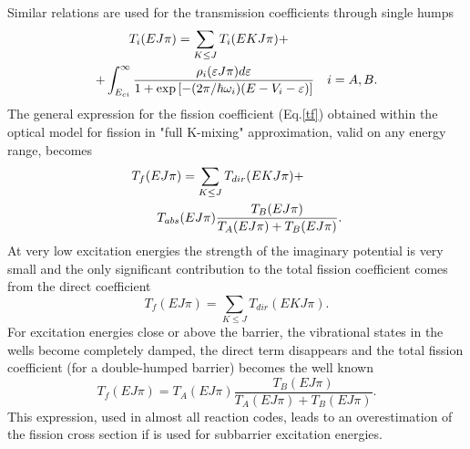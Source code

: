 Similar relations are used for the transmission coefficients through single
humps 
\begin{eqnarray}
T_{i}(EJ\pi)=\sum_{K\le J}T_{i}(EKJ\pi) +\qquad\qquad\qquad\quad  \notag \\
+ \int_{E_{ci}}^{\infty} \frac {\rho_{i}(\varepsilon J\pi)d\varepsilon} {%
1+\exp\left[ -({2\pi}/\hbar\omega_{i}) (E-V_{i}-\varepsilon)\right] } \quad
i=A,B.  \label{tfi}
\end{eqnarray}
The general expression for the fission coefficient (Eq.\ref{tf}) obtained
within the optical model for fission in "full K-mixing" approximation, valid
on any energy range, becomes 
\begin{eqnarray}
T_{f}(EJ\pi)=\sum_{K\le J}T_{dir}(EKJ\pi)+\qquad\quad  \notag \\
T_{abs}(E J \pi)\frac{T_{B}(E J \pi)}{T_{A}(E J \pi)+T_{B}(E J \pi)}.
\label{tfis}
\end{eqnarray}
At very low excitation energies the strength of the imaginary potential is
very small and the only significant contribution to the total fission
coefficient comes from the direct coefficient 
\begin{equation}
T_{f}(EJ\pi)=\sum_{K\le J}T_{dir}(EKJ\pi).  \label{tf-zero}
\end{equation}
For excitation energies close or above the barrier, the vibrational states
in the wells become completely damped, the direct term disappears and the
total fission coefficient (for a double-humped barrier) becomes the well
known 
\begin{equation}
T_{f}(E J \pi)=T_{A}(E J \pi)\frac{T_{B}(E J \pi)}{T_{A}(E J \pi)+T_{B}(E J
\pi)}.  \label{tf-full}
\end{equation}
This expression, used in almost all reaction codes, leads to an
overestimation of the fission cross section if is used for subbarrier
excitation energies.

